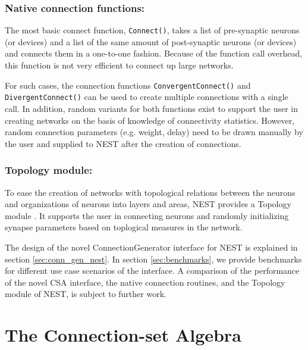 \documentclass{frontiersSCNS} %
\newcommand{\tbw}[1]{{\bf\parindent0pt\color{red}#1}}
\begin{document}
\subsubsection*{Native connection functions:}

The most basic connect function, \verb|Connect()|, takes a list of
pre-synaptic neurons (or devices) and a list of the same amount of
post-synaptic neurons (or devices) and connects them in a one-to-one
fashion. Because of the function call overhead, this function is not
very efficient to connect up large networks.

For such cases, the connection functions \verb|ConvergentConnect()|
and \verb|DivergentConnect()| can be used to create multiple
connections with a single call. In addition, random variants for both
functions exist to support the user in creating networks on the basis
of knowledge of connectivity statistics. However, random connection
parameters (e.g. weight, delay) need to be drawn manually by the user
and supplied to NEST after the creation of connections.


\subsubsection*{Topology module:}

To ease the creation of networks with topological relations between
the neurons and organizations of neurons into layers and areas, NEST
provides a Topology module \citep{Plesser_13}. It supports the user in
connecting neurons and randomly initializing synapse parameters based
on toplogical measures in the network.

The design of the novel ConnectionGenerator interface for NEST is
explained in section \ref{sec:conn_gen_nest}. In section
\ref{sec:benchmarks}, we provide benchmarks for different use case
scenarios of the interface. A comparison of the performance of the
novel CSA interface, the native connection routines, and the Topology
module of NEST, is subject to further work.


\section{The Connection-set Algebra}\label{sec:csa}
\end{document}
